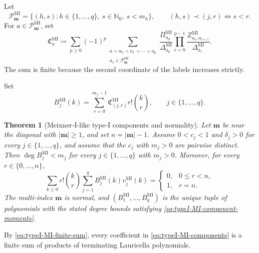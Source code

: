\documentclass[10pt]{amsart}
\newcommand{\Nzero}{\mathbb N_0}
\newcommand{\abs}[1]{\lvert#1\rvert}
\theoremstyle{plain}
\newtheorem{theorem}{Theorem}[section]
\theoremstyle{definition}
\theoremstyle{remark}
\begin{document}
Let
\[
 \mathscr P_{\boldsymbol m}^{\mathrm{MI}}
 =\{(h,s):h\in\{1,\ldots,q\},\ s\in\Nzero,\ s<m_h\},
 \qquad
 (h,s)\prec(j,r)\Longleftrightarrow s<r.
\]
For \(a\in\mathscr P_{\boldsymbol m}^{\mathrm{MI}}\), set
\begin{equation}
 \mathfrak C_a^{\mathrm{MI}}
 \coloneq
 \sum_{p\ge0}(-1)^p
 \sum_{\substack{a=a_0\prec a_1\prec\cdots\prec a_p\\
                  a_v\in\mathscr P_{\boldsymbol m}^{\mathrm{MI}}}}
 \frac{\Pi_{a_p}^{\mathrm{MI}}}
 {\Delta_{a_p}^{\mathrm{MI}}}
 \prod_{v=0}^{p-1}
 \frac{Z_{a_v,a_{v+1}}^{\mathrm{MI}}}
 {\Delta_{a_v}^{\mathrm{MI}}}.
 \label{eq:typeI-MI-finite-sum}
\end{equation}
The sum is finite because the second coordinate of the labels increases
strictly.

Set
\begin{equation}
 B_j^{\mathrm{MI}}(k)
 =\sum_{r=0}^{m_j-1}
 \mathfrak C_{(j,r)}^{\mathrm{MI}}r!\binom{k}{r},
 \qquad j\in\{1,\ldots,q\}.
 \label{eq:typeI-MI-components}
\end{equation}

\begin{theorem}[Meixner-I-like type-I components and normality]
\label{thm:explicit-MI-B}
Let \(\boldsymbol m\) be near the diagonal with
\(\abs{\boldsymbol m}\ge1\), and set \(n=\abs{\boldsymbol m}-1\). Assume
\(0<c_j<1\) and \(\delta_j>0\) for every \(j\in\{1,\ldots,q\}\), and assume that
the \(c_j\) with \(m_j>0\) are pairwise distinct. Then
\(\deg B_j^{\mathrm{MI}}<m_j\) for every
\(j\in\{1,\ldots,q\}\) with \(m_j>0\). Moreover, for every
\(r\in\{0,\ldots,n\}\),
\begin{equation}
 \sum_{k\ge0} r!\binom{k}{r}
 \sum_{j=1}^q B_j^{\mathrm{MI}}(k)v_j^{\mathrm{MI}}(k)
 =\begin{cases}0,&0\le r<n,\\1,&r=n.\end{cases}
 \label{eq:typeI-MI-component-moments}
\end{equation}
The multi-index \(\boldsymbol m\) is normal, and
\((B_1^{\mathrm{MI}},\ldots,B_q^{\mathrm{MI}})\) is the unique tuple of
polynomials with the stated degree bounds satisfying
\eqref{eq:typeI-MI-component-moments}.
\end{theorem}

By \eqref{eq:typeI-MI-finite-sum}, every coefficient in
\eqref{eq:typeI-MI-components} is a finite sum of products of terminating
Lauricella polynomials.
\end{document}
